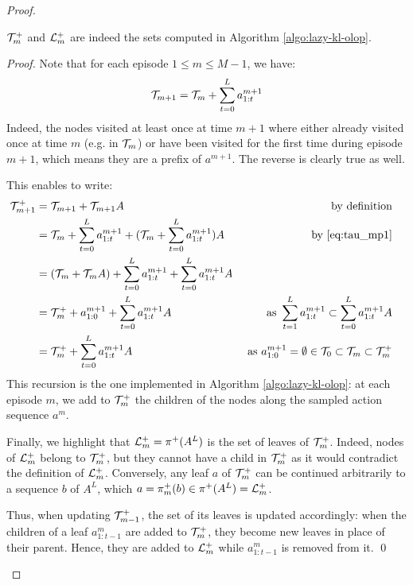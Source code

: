 \documentclass[runningheads, envcountsame, a4paper]{llncs}
\begin{document}
\begin{proof}
\begin{lemma}
$\mathcal{T}_m^+$ and $\mathcal{L}_m^+$ are indeed the sets computed in Algorithm  \ref{algo:lazy-kl-olop}.
\end{lemma}
\begin{proof}
Note that for each episode $1 \leq m \leq M - 1$, we have:
\begin{equation}
\label{eq:tau_mp1}
    \mathcal{T}_{m+1} = \mathcal{T}_{m} + \sum_{t=0}^L a^{m+1}_{1:t}
\end{equation}
Indeed, the nodes visited at least once at time $m+1$ where either already visited once at time $m$ (e.g. in $\mathcal{T}_{m}$) or have been visited for the first time during episode $m+1$, which means they are a prefix of $a^{m+1}$. The reverse is clearly true as well.

This enables to write:
\begin{align*}
    \mathcal{T}_{m+1}^+ &= \mathcal{T}_{m+1} + \mathcal{T}_{m+1}A & \text{by definition}\\
    &= \mathcal{T}_{m} + \sum_{t=0}^L a^{m+1}_{1:t} + (\mathcal{T}_{m} + \sum_{t=0}^L a^{m+1}_{1:t})A & \text{by \eqref{eq:tau_mp1}} & \\
    &= (\mathcal{T}_{m} + \mathcal{T}_{m}A) + \sum_{t=0}^L a^{m+1}_{1:t} + \sum_{t=0}^L a^{m+1}_{1:t}A & \\
    &= \mathcal{T}_{m}^+ + a^{m+1}_{1:0} + \sum_{t=0}^L a^{m+1}_{1:t}A &\text{ as } \sum_{t=1}^L a^{m+1}_{1:t} \subset \sum_{t=0}^L a^{m+1}_{1:t}A\\
    &=  \mathcal{T}_{m}^+ + \sum_{t=0}^L a^{m+1}_{1:t}A  &\text{ as }a^{m+1}_{1:0}=\emptyset \in \mathcal{T}_{0} \subset \mathcal{T}_{m} \subset \mathcal{T}_m^+
\end{align*}
This recursion is the one implemented in Algorithm \ref{algo:lazy-kl-olop}: at each episode $m$, we add to $\mathcal{T}_{m}^+$ the children of the nodes along the sampled action sequence $a^{m}$.

Finally, we highlight that $\mathcal{L}_m^+ = \pi^+(A^L)$ is the set of leaves of $\mathcal{T}_{m}^+$.
Indeed, nodes of $\mathcal{L}_m^+$ belong to $\mathcal{T}_{m}^+$, but they cannot have a child in $\mathcal{T}_{m}^+$ as it would contradict the definition of $\mathcal{L}_m^+$. Conversely, any leaf $a$ of $\mathcal{T}_{m}^+$ can be continued arbitrarily to a sequence $b$ of $A^L$, which  $a = \pi_m^+(b) \in \pi^+(A^L) = \mathcal{L}_m^+$.

Thus, when updating $\mathcal{T}_{m-1}^+$, the set of its leaves is updated accordingly: when the children of a leaf $a^m_{1:t-1}$ are added to $\mathcal{T}_m^+$, they become new leaves in place of their parent. Hence, they are added to $\mathcal{L}_m^+$ while $a^m_{1:t-1}$ is removed from it.
\qed
\end{proof}


\end{proof}
\end{document}
